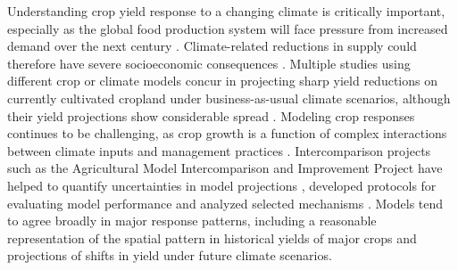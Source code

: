 \documentclass[gmd, manuscript]{copernicus} %
\begin{document}
\introduction
\label{S:1}
Understanding crop yield response to a changing climate is critically important, especially as the global food production system will face pressure from increased demand over the next century \citep{bodirsky2015}. 
Climate-related reductions in supply could therefore have severe socioeconomic consequences \citep[e.g.][]{Stevanovic2016,Wiebe_2015}. 
Multiple studies using different crop or climate models concur in projecting sharp yield reductions on currently cultivated cropland under {business-as-usual} climate scenarios, although their yield projections show considerable spread \citep[e.g.][and references therein]{Rosenzweig2014, Schauberger2017, porter2014}. 
Modeling crop responses continues to be challenging, as crop growth is a function of complex interactions between climate inputs and management practices \citep{Boote13,rotter2011}. 
Intercomparison projects such as the Agricultural Model Intercomparison and Improvement Project \citep[AgMIP][]{ROSENZWEIG2013} have helped to quantify uncertainties in model projections \citep{Rosenzweig2014}, developed protocols \citep{Elliott2015} for evaluating model performance \citep{muller_global_2017} and analyzed selected mechanisms \citep[e.g.][]{Schauberger2017}.
Models tend to agree broadly in major response patterns, including a reasonable representation of the spatial pattern in historical yields of major crops \citep[e.g.][]{Elliott2015, muller_global_2017} and projections of shifts in yield under future climate scenarios. 


\end{document}
